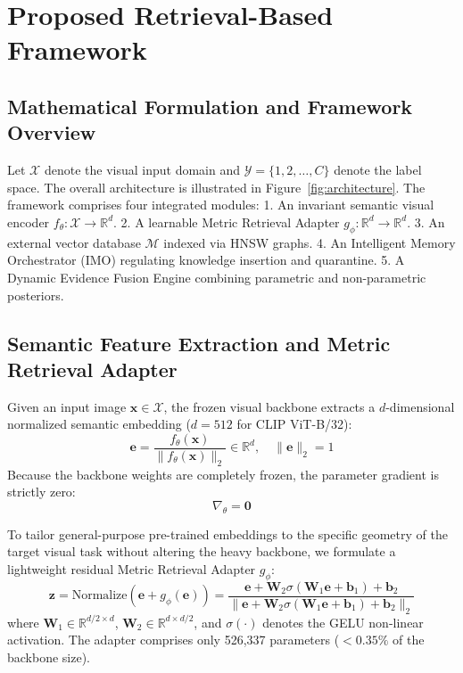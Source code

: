 \documentclass[sn-mathphys,Numbered]{sn-jnl}
\begin{document}
\section{Proposed Retrieval-Based Framework}\label{sec:method}

\subsection{Mathematical Formulation and Framework Overview}
Let $\mathcal{X}$ denote the visual input domain and $\mathcal{Y} = \{1, 2, \dots, C\}$ denote the label space. The overall architecture is illustrated in Figure~\ref{fig:architecture}. The framework comprises four integrated modules:
1. An invariant semantic visual encoder $f_\theta: \mathcal{X} \to \mathbb{R}^d$.
2. A learnable Metric Retrieval Adapter $g_\phi: \mathbb{R}^d \to \mathbb{R}^d$.
3. An external vector database $\mathcal{M}$ indexed via HNSW graphs.
4. An Intelligent Memory Orchestrator (IMO) regulating knowledge insertion and quarantine.
5. A Dynamic Evidence Fusion Engine combining parametric and non-parametric posteriors.

\subsection{Semantic Feature Extraction and Metric Retrieval Adapter}
Given an input image $\mathbf{x} \in \mathcal{X}$, the frozen visual backbone extracts a $d$-dimensional normalized semantic embedding ($d=512$ for CLIP ViT-B/32):
\begin{equation}
\mathbf{e} = \frac{f_\theta(\mathbf{x})}{\|f_\theta(\mathbf{x})\|_2} \in \mathbb{R}^d, \quad \|\mathbf{e}\|_2 = 1
\label{eq:clip_embed}
\end{equation}
Because the backbone weights are completely frozen, the parameter gradient is strictly zero:
\begin{equation}
\nabla_\theta = \mathbf{0}
\label{eq:param_zero}
\end{equation}

To tailor general-purpose pre-trained embeddings to the specific geometry of the target visual task without altering the heavy backbone, we formulate a lightweight residual Metric Retrieval Adapter $g_\phi$:
\begin{equation}
\mathbf{z} = \text{Normalize}\left(\mathbf{e} + g_\phi(\mathbf{e})\right) = \frac{\mathbf{e} + \mathbf{W}_2 \sigma(\mathbf{W}_1 \mathbf{e} + \mathbf{b}_1) + \mathbf{b}_2}{\|\mathbf{e} + \mathbf{W}_2 \sigma(\mathbf{W}_1 \mathbf{e} + \mathbf{b}_1) + \mathbf{b}_2\|_2}
\label{eq:adapter_proj}
\end{equation}
where $\mathbf{W}_1 \in \mathbb{R}^{d/2 \times d}$, $\mathbf{W}_2 \in \mathbb{R}^{d \times d/2}$, and $\sigma(\cdot)$ denotes the GELU non-linear activation. The adapter comprises only 526,337 parameters ($<0.35\%$ of the backbone size).
\end{document}
